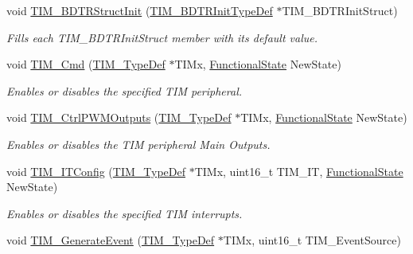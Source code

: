 \begin{DoxyCompactItemize}
void \mbox{\hyperlink{group___t_i_m___exported___functions_gaea0f49938cda8ae0738162194798afc6}{T\+I\+M\+\_\+\+B\+D\+T\+R\+Struct\+Init}} (\mbox{\hyperlink{struct_t_i_m___b_d_t_r_init_type_def}{T\+I\+M\+\_\+\+B\+D\+T\+R\+Init\+Type\+Def}} $\ast$T\+I\+M\+\_\+\+B\+D\+T\+R\+Init\+Struct)
\begin{DoxyCompactList}\small\item\em Fills each T\+I\+M\+\_\+\+B\+D\+T\+R\+Init\+Struct member with its default value. \end{DoxyCompactList}\item 
void \mbox{\hyperlink{group___t_i_m___exported___functions_ga2bdc275bcbd2ce9d1ba632e6c89896b7}{T\+I\+M\+\_\+\+Cmd}} (\mbox{\hyperlink{struct_t_i_m___type_def}{T\+I\+M\+\_\+\+Type\+Def}} $\ast$T\+I\+Mx, \mbox{\hyperlink{group___exported__types_gac9a7e9a35d2513ec15c3b537aaa4fba1}{Functional\+State}} New\+State)
\begin{DoxyCompactList}\small\item\em Enables or disables the specified T\+IM peripheral. \end{DoxyCompactList}\item 
void \mbox{\hyperlink{group___t_i_m___exported___functions_ga3e59ebced2ab8e0b817c460f1670e97d}{T\+I\+M\+\_\+\+Ctrl\+P\+W\+M\+Outputs}} (\mbox{\hyperlink{struct_t_i_m___type_def}{T\+I\+M\+\_\+\+Type\+Def}} $\ast$T\+I\+Mx, \mbox{\hyperlink{group___exported__types_gac9a7e9a35d2513ec15c3b537aaa4fba1}{Functional\+State}} New\+State)
\begin{DoxyCompactList}\small\item\em Enables or disables the T\+IM peripheral Main Outputs. \end{DoxyCompactList}\item 
void \mbox{\hyperlink{group___t_i_m___exported___functions_ga70e3d6c09d55ee69002e154c85cd40e4}{T\+I\+M\+\_\+\+I\+T\+Config}} (\mbox{\hyperlink{struct_t_i_m___type_def}{T\+I\+M\+\_\+\+Type\+Def}} $\ast$T\+I\+Mx, uint16\+\_\+t T\+I\+M\+\_\+\+IT, \mbox{\hyperlink{group___exported__types_gac9a7e9a35d2513ec15c3b537aaa4fba1}{Functional\+State}} New\+State)
\begin{DoxyCompactList}\small\item\em Enables or disables the specified T\+IM interrupts. \end{DoxyCompactList}\item 
void \mbox{\hyperlink{group___t_i_m___exported___functions_ga38bd4ffda920dd4f7655a0a2c6100a6e}{T\+I\+M\+\_\+\+Generate\+Event}} (\mbox{\hyperlink{struct_t_i_m___type_def}{T\+I\+M\+\_\+\+Type\+Def}} $\ast$T\+I\+Mx, uint16\+\_\+t T\+I\+M\+\_\+\+Event\+Source)

\end{DoxyCompactItemize}
